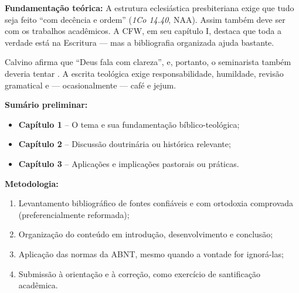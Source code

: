 \documentclass[12pt, openright, oneside, a4paper, english, brazil]{abntex2}
\begin{document}
\noindent
\textbf{Fundamentação teórica:} A estrutura eclesiástica presbiteriana exige que tudo seja feito “com decência e ordem” (\textit{1Co 14.40}, NAA). Assim também deve ser com os trabalhos acadêmicos. A CFW, em seu capítulo I, destaca que toda a verdade está na Escritura — mas a bibliografia organizada ajuda bastante.

Calvino afirma que “Deus fala com clareza”, e, portanto, o seminarista também deveria tentar \cite[p.~453]{calvinoInstitutas}. A escrita teológica exige responsabilidade, humildade, revisão gramatical e — ocasionalmente — café e jejum.

\noindent
\textbf{Sumário preliminar:}
\begin{itemize}
  \item \textbf{Capítulo 1} – O tema e sua fundamentação bíblico-teológica;
  \item \textbf{Capítulo 2} – Discussão doutrinária ou histórica relevante;
  \item \textbf{Capítulo 3} – Aplicações e implicações pastorais ou práticas.
\end{itemize}

\noindent
\textbf{Metodologia:}
\begin{enumerate}
  \item Levantamento bibliográfico de fontes confiáveis e com ortodoxia comprovada (preferencialmente reformada);
  \item Organização do conteúdo em introdução, desenvolvimento e conclusão;
  \item Aplicação das normas da ABNT, mesmo quando a vontade for ignorá-las;
  \item Submissão à orientação e à correção, como exercício de santificação acadêmica.
\end{enumerate}



\end{document}
